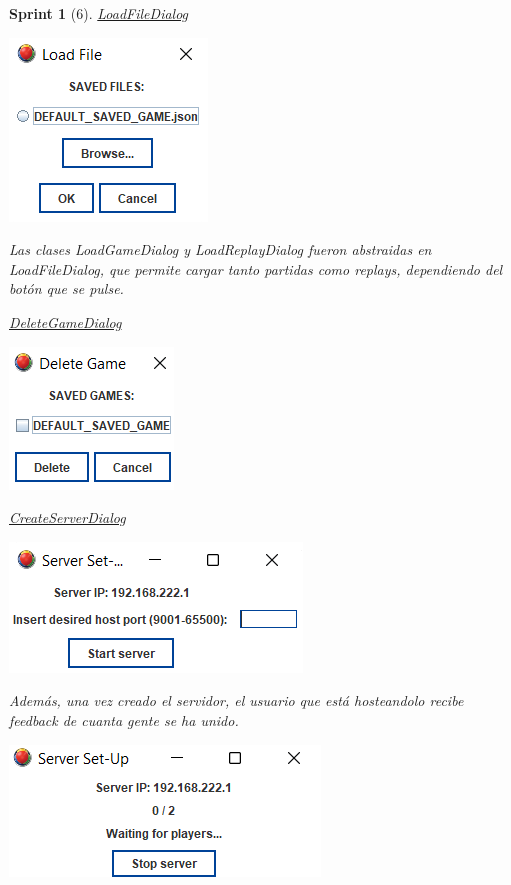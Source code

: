 \documentclass[12pt,a4paper,openright]{book}
\theoremstyle{break}
\newtheorem*{sprint}{Sprint}
\begin{document}
\begin{sprint}[6]
\underline{LoadFileDialog}
\begin{center}
\includegraphics[scale=1]{load-game-sprint-6.png}
\end{center}

Las clases \textit{LoadGameDialog} y \textit{LoadReplayDialog} fueron abstraidas en \textit{LoadFileDialog}, que permite cargar tanto partidas como \textit{replays}, dependiendo del botón que se pulse.

\underline{DeleteGameDialog}
\begin{center}
\includegraphics[scale=1]{delete-dialog-sprint6.png}
\end{center}

\underline{CreateServerDialog}

\begin{center}
\includegraphics[scale=1]{server-setup-sprint-6.png}
\end{center}

Además, una vez creado el servidor, el usuario que está hosteandolo recibe feedback de cuanta gente se ha unido.

\begin{center}
\includegraphics[scale=1]{server-feedback.png}
\end{center}


\end{sprint}
\end{document}
